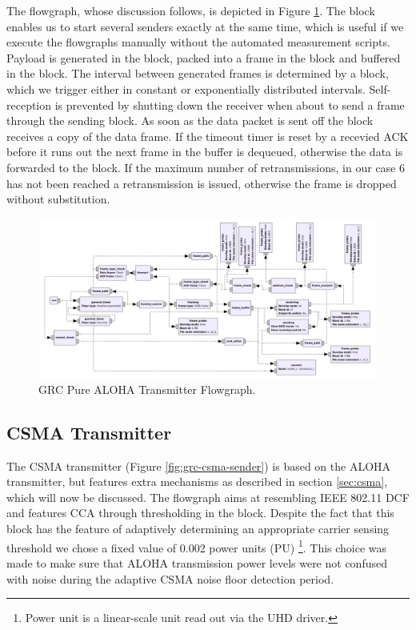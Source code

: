 The flowgraph, whose discussion follows, is depicted in Figure \ref{fig:grc-aloha-sender}. The  block enables us to start several senders exactly at the same time, which is useful if we execute the flowgraphs manually without the automated measurement scripts. Payload is generated in the  block, packed into a frame in the  block and buffered in the  block. The interval between generated frames is determined by a  block, which we trigger either in constant or exponentially distributed intervals. Self-reception is prevented by shutting down the receiver when about to send a frame through the sending block. As soon as the data packet is sent off the  block receives a copy of the data frame. If the timeout timer is reset by a recevied ACK before it runs out the next frame in the buffer is dequeued, otherwise the data is forwarded to the  block. If the maximum number of retransmissions, in our case 6 has not been reached a retransmission is issued, otherwise the frame is dropped without substitution.

\begin{figure}
	\label{fig:grc-aloha-sender}
	\begin{center}
		\includegraphics[width=\textwidth]{pictures/grc_aloha_transmitter_flowgraph}
\end{center}
\caption{GRC Pure ALOHA Transmitter Flowgraph.}
\end{figure}

\subsection{CSMA Transmitter}
\label{sec:csma-transmiter}

The CSMA transmitter (Figure \ref{fig:grc-csma-sender}) is based on the ALOHA transmitter, but features extra mechanisms as described in section \ref{sec:csma}, which will now be discussed. The flowgraph aims at resembling IEEE 802.11 DCF and features CCA through thresholding in the  block. Despite the fact that this block has the feature of adaptively determining an appropriate carrier sensing threshold we chose a fixed value of 0.002 power units (PU) \footnote{Power unit is a linear-scale unit read out via the UHD driver.}. This choice was made to make sure that ALOHA transmission power levels were not confused with noise during the adaptive CSMA noise floor detection period. 

